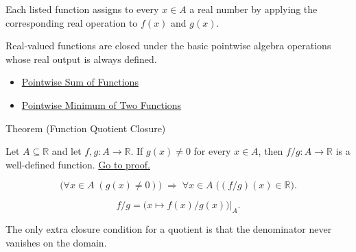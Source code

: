 \begin{remark*}
Each listed function assigns to every \(x\in A\) a real number by applying the
corresponding real operation to \(f(x)\) and \(g(x)\).
\end{remark*}

\begin{remark*}[Interpretation]
Real-valued functions are closed under the basic pointwise algebra operations
whose real output is always defined.
\end{remark*}

\begin{dependencies}
\begin{itemize}
  \item \hyperref[def:pointwise-sum-of-functions]{Pointwise Sum of Functions}
  \item \hyperref[def:pointwise-minimum-of-two-functions]{Pointwise Minimum of Two Functions}
\end{itemize}
\end{dependencies}

\begin{theorembox}{Theorem (Function Quotient Closure)}
\begin{theorem}
\label{thm:function-quotient-closure}
Let \(A\subseteq\mathbb{R}\) and let \(f,g:A\to\mathbb{R}\).  If
\(g(x)\neq0\) for every \(x\in A\), then \(f/g:A\to\mathbb{R}\) is a
well-defined function.
\hyperref[prf:function-quotient-closure]{Go to proof.}
\end{theorem}
\end{theorembox}

\begin{remark*}
\[
  \bigl(\forall x\in A\;(g(x)\neq0)\bigr)
  \;\Longrightarrow\;
  \forall x\in A\;\bigl((f/g)(x)\in\mathbb{R}\bigr).
\]
\end{remark*}

\begin{remark*}
\[
  f/g
  =
  \bigl(x\mapsto f(x)/g(x)\bigr)\big|_{A}.
\]
\end{remark*}

\begin{remark*}[Interpretation]
The only extra closure condition for a quotient is that the denominator never
vanishes on the domain.
\end{remark*}

